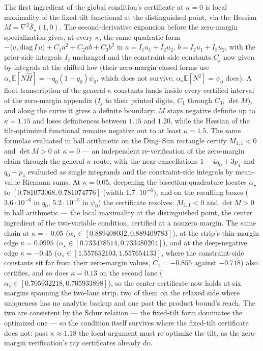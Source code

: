 \documentclass[11pt]{article}
\theoremstyle{remark}
\newcommand{\E}{\mathbb{E}}
\begin{document}
The first ingredient of the global condition's certificate at
$\kappa=0$ is local maximality of the fixed-tilt functional at the
distinguished point, via the Hessian
$M=\nabla^2\bar{\mathcal S}_\star(1,0)$.  The second-derivative
expansion before the zero-margin specialization gives, at every
$\kappa$, the same quadratic form
$-\langle u,\mathrm{diag}\,I\,u\rangle+C_1a^2+C_2ab+C_3b^2$ in
$a=I_1u_1+I_2u_2$, $b=I_2u_1+I_3u_2$, with the prior-side integrals
$I_j$ unchanged and the constraint-side constants $C_j$ now given by
integrals at the shifted law (their zero-margin closed forms use
$\alpha_\star\E[N\hat H]=-q_0(1-q_0)\psi_0$, which does not survive;
$\alpha_\star\E[N^2]=\psi_0$ does).  A float transcription of the
general-$\kappa$ constants lands inside every certified interval of
the zero-margin appendix ($I_j$ to their printed digits, $C_1$
through $C_3$, $\det M$), and along the curve it gives a definite
boundary: $M$ stays negative definite up to $\kappa=1.15$ and loses
definiteness between $1.15$ and $1.20$, while the Hessian of the
tilt-optimized functional remains negative out to at least
$\kappa=1.5$.  The same formulas evaluated in ball arithmetic on the
Ding--Sun rectangle certify $M_{1,1}<0$ and $\det M>0$ at $\kappa=0$
--- an independent re-verification of the zero-margin claim through
the general-$\kappa$ route, with the near-cancellations
$1-4q_0+3p_4$ and $q_0-p_4$ evaluated as single integrands and the
constraint-side integrals by mean-value Riemann sums.  At $\kappa=0.05$, deepening the
bisection quadrature locates $\alpha_\star$ to
$[0.781073068,0.781074776]$ (width $1.7\cdot10^{-6}$), and on the
resulting boxes ($3.6\cdot10^{-6}$ in $q_0$, $5.2\cdot10^{-5}$ in
$\psi_0$) the certificate resolves: $M_{1,1}<0$ and $\det M>0$ in
ball arithmetic --- the local maximality at the distinguished point,
the center ingredient of the two-variable condition, certified at a
nonzero margin.  The same chain at $\kappa=-0.05$
($\alpha_\star\in[0.889408032,0.889409783]$), at the strip's
thin-margin edge $\kappa=0.0995$
($\alpha_\star\in[0.733478514,0.733480204]$), and at the
deep-negative edge $\kappa=-0.45$
($\alpha_\star\in[1.557652103,1.557654133]$, where the
constraint-side constants sit far from their zero-margin values,
$C_1=-0.855$ against $-0.718$) also certifies, and so does
$\kappa=0.13$ on the second lane
($\alpha_\star\in[0.705932218,0.705933898]$), so the center
certificate now holds at six margins spanning the two-lane strip,
two of them on the relaxed side where uniqueness has no analytic
backup and one past the product bound's reach.  The two are consistent by the Schur relation --- the
fixed-tilt form dominates the optimized one --- so the condition
itself survives where the fixed-tilt certificate does not: past
$\kappa\approx1.18$ the local argument must re-optimize the tilt,
as the zero-margin verification's ray certificates already do.
\end{document}

